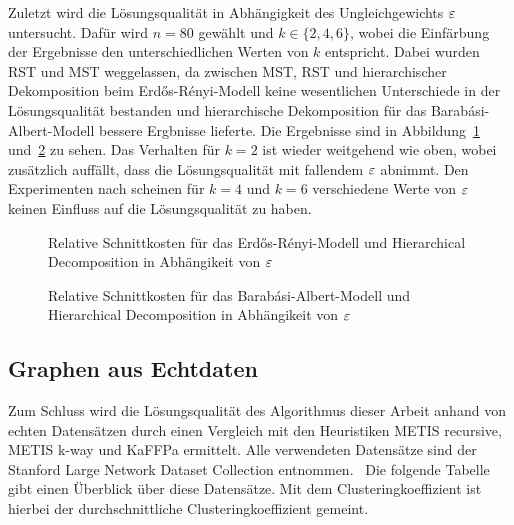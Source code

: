 Zuletzt wird die Lösungsqualität in Abhängigkeit des Ungleichgewichts $\varepsilon$ untersucht.
Dafür wird $n=80$ gewählt und $k \in \{2, 4, 6\}$, wobei die Einfärbung der Ergebnisse den unterschiedlichen Werten von $k$ entspricht.
Dabei wurden RST und MST weggelassen, da zwischen MST, RST und hierarchischer Dekomposition beim Erdős-Rényi-Modell keine wesentlichen Unterschiede in der Lösungsqualität bestanden und hierarchische Dekomposition für das Barabási-Albert-Modell bessere Ergbnisse lieferte.
Die Ergebnisse sind in Abbildung~\ref{fig:edgeprobhdecompimb} und~\ref{fig:prefattachhdecompimb} zu sehen.
Das Verhalten für $k=2$ ist wieder weitgehend wie oben, wobei zusätzlich auffällt, dass die Lösungsqualität mit fallendem $\varepsilon$ abnimmt.
Den Experimenten nach scheinen für $k=4$ und $k=6$ verschiedene Werte von $\varepsilon$ keinen Einfluss auf die Lösungsqualität zu haben.


\begin{figure}[H]
    \centering
    
    \caption{Relative Schnittkosten für das Erdős-Rényi-Modell und Hierarchical Decomposition in Abhängikeit von $\varepsilon$\label{fig:edgeprobhdecompimb}}
\end{figure}

%    
%
%    

\begin{figure}[H]
    \centering
    
    \caption{Relative Schnittkosten für das Barabási-Albert-Modell und Hierarchical Decomposition in Abhängikeit von $\varepsilon$\label{fig:prefattachhdecompimb}}
\end{figure}

\subsection{Graphen aus Echtdaten}
Zum Schluss wird die Lösungsqualität des Algorithmus dieser Arbeit anhand von echten Datensätzen durch einen Vergleich mit den Heuristiken METIS recursive, METIS k-way und KaFFPa ermittelt.
Alle verwendeten Datensätze sind der Stanford Large Network Dataset Collection entnommen.~\cite{LK14}
Die folgende Tabelle gibt einen Überblick über diese Datensätze.
Mit dem Clusteringkoeffizient ist hierbei der durchschnittliche Clusteringkoeffizient gemeint.

